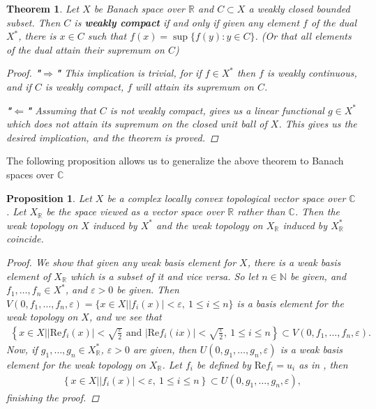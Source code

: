 \documentclass[10pt,twoside,openany,final]{memoir}
\theoremstyle{break}
\newtheorem{theorem}[section]{Theorem}
\newtheorem{proposition}[section]{Proposition}
\theoremstyle{Break}
\newcommand{\R}{\mathbb{R}}
\newcommand{\C}{\mathbb{C}}
\newcommand{\N}{\mathbb{N}}
\begin{document}
\begin{theorem}\label{realweakcompact}
Let $X$ be Banach space over $\R$ and $C \subset X$ a weakly closed bounded subset. Then $C$ is \textbf{weakly compact} if and only if given any element $f$ of the dual $X^*$, there is $x \in C$ such that $f(x)=\sup\{f(y): y \in C\}$. \textit{(Or that all elements of the dual attain their supremum on $C$)}
\begin{proof}
\textbf{"$\Rightarrow$"} This implication is trivial, for if $f \in X^*$ then $f$ is weakly continuous, and if $C$ is weakly compact, $f$ will attain its supremum on $C$.

\noindent \textbf{"$\Leftarrow$"} Assuming that $C$ is not weakly compact,  gives us a linear functional $g\in X^*$ which does not attain its supremum on the closed unit ball of $X$. This gives us the desired implication, and the theorem is proved.
\end{proof}
\end{theorem} 
The following proposition allows us to generalize the above theorem to Banach spaces over $\C$
\begin{proposition}\label{realcomplex}
Let $X$ be a complex locally convex topological vector space over $\C$. Let $X_{\R}$ be the space viewed as a vector space over $\R$ rather than $\C$. Then the weak topology on $X$ induced by $X^*$ and the weak topology on $X_{\R}$ induced by $X_{\R}^*$ coincide.
\begin{proof}
We show that given any weak basis element for $X$, there is a weak basis element of $X_{\R}$ which is a subset of it and vice versa. So let $n \in \N$ be given, and $f_{1},\dots, f_{n} \in X^*$, and $\varepsilon>0$ be given. Then $V(0,f_{1},\dots,f_{n},\varepsilon)=\{ x \in X \big| |f_{i}(x)|<\varepsilon, \ 1 \leq i \leq n \}$ is a basis element for the weak topology on $X$, and we see that 
\begin{align*}
\left\{x \in X \big| | \text{Re}f_{i}(x)| < \sqrt{\frac{\varepsilon}{2}} \text{ and } |\text{Re}f_{i}(ix) | < \sqrt{\frac{\varepsilon}{2}}, \ 1 \leq i \leq n \right\} \subset V(0,f_{1},\dots,f_{n},\varepsilon).
\end{align*}
Now, if $g_{1},\dots,g_{n} \in X_{\R}^*$, $\varepsilon>0$ are given, then $U(0,g_{1},\dots,g_{n},\varepsilon)$ is a weak basis element for the weak topology on $X_{\R}$. Let $f_{i}$ be defined by $\text{Re}f_{i}=u_{i}$ as in , then 
\begin{align*}
\left\{ x \in X \big| |f_{i}(x)|<\varepsilon, \ 1 \leq i \leq n\right\} \subset U(0,g_{1},\dots,g_{n},\varepsilon),
\end{align*}
finishing the proof.
\end{proof}
\end{proposition}
\end{document}
